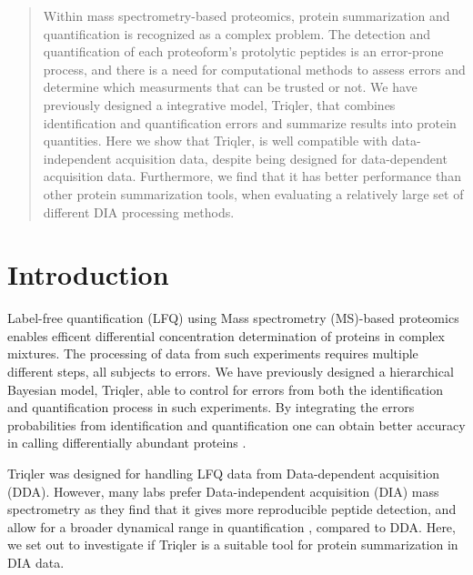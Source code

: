 \documentclass[10pt,letterpaper]{article}
\begin{document}
\maketitle



\begin{abstract}

Within mass spectrometry-based proteomics, protein summarization and quantification is recognized as a complex problem. The detection and quantification of each proteoform's protolytic peptides is an error-prone process, and there is a need for computational methods to assess errors and determine which measurments that can be trusted or not.  We have previously designed a integrative model, Triqler, that combines identification and quantification errors and summarize results into protein quantities. 
Here we show that Triqler, is well compatible with data-independent acquisition data, despite being designed for data-dependent acquisition data. Furthermore, we find that it has better performance than other protein summarization tools, when evaluating a relatively large set of different DIA processing methods. 

\end{abstract}
  

\section*{Introduction}

Label-free quantification (LFQ) using Mass spectrometry (MS)-based proteomics enables efficent differential concentration determination of proteins in complex mixtures. The processing of data from such experiments requires multiple different steps, all subjects to errors. We have previously designed a hierarchical Bayesian model, Triqler, able to control for errors from both the identification and quantification process in such experiments\cite{The2018Integrated}. By integrating the errors probabilities from identification and quantification one can obtain better accuracy in calling differentially abundant proteins \cite{The2018Integrated}.   

Triqler was designed for handling LFQ data from Data-dependent acquisition (DDA). However, many labs prefer Data-independent acquisition (DIA) mass spectrometry \cite{venable2004automated} as they find that it gives more reproducible peptide detection, and allow for a broader dynamical range in quantification \cite{bern2010deconvolution,zhang2020DIA}, compared to DDA. Here, we set out to investigate if Triqler is a suitable tool for protein summarization in DIA data.
\end{document}
